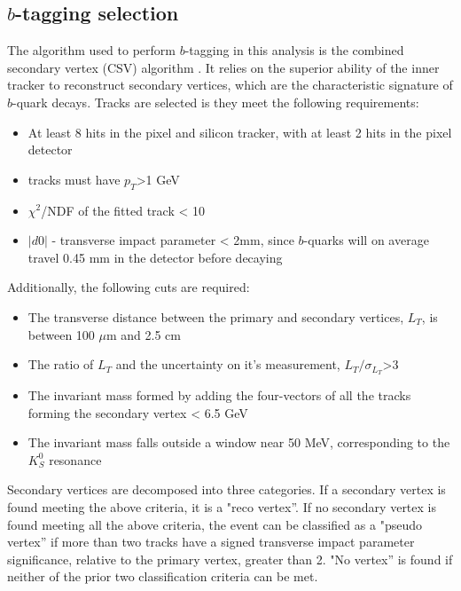 \subsection{$b$-tagging selection}
\label{btag_overview}

\par The algorithm used to perform $b$-tagging in this analysis is the
combined secondary vertex (CSV) algorithm \cite{Weiser:927399}.  It
relies on the superior ability of the inner tracker to reconstruct
secondary vertices, which are the characteristic signature of
$b$-quark decays.  Tracks are selected is they meet the following
requirements: 
\begin{itemize}
  \item At least 8 hits in the pixel and silicon tracker, with at
    least 2 hits in the pixel detector
  \item tracks must have $p_{T}$>1 GeV
  \item $\chi^{2}$/NDF of the fitted track < 10
  \item $|d0|$ - transverse impact parameter < 2mm, since $b$-quarks
    will on average travel 0.45 mm in the detector before decaying
\end{itemize}

\noindent  Additionally, the following cuts are required:
\begin{itemize}
  \item The transverse distance between the primary and secondary
    vertices, $L_{T}$, is between 100 $\mu$m and 2.5 cm
  \item The ratio of $L_{T}$ and the uncertainty on it's measurement,
    $L_{T}/\sigma_{L_{T}}$>3 
  \item The invariant mass formed by adding the four-vectors of all
    the tracks forming the secondary vertex < 6.5 GeV
  \item The invariant mass falls outside a window near 50 MeV,
    corresponding to the $K_{S}^{0}$ resonance
\end{itemize}

\noindent  Secondary vertices are decomposed into three categories.
If a secondary vertex is found meeting the above criteria, it is a
"reco vertex''.  If no secondary vertex is found meeting all the above
criteria, the event can be classified as a "pseudo vertex'' if more
than two tracks have a signed transverse impact parameter
significance, relative to the primary vertex, greater than 2.  "No
vertex'' is found if neither of the prior two classification criteria
can be met.  
 
